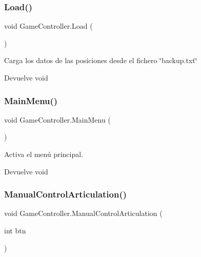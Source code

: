 \subsubsection{\texorpdfstring{Load()}{Load()}}
{\footnotesize\ttfamily void Game\+Controller.\+Load (\begin{DoxyParamCaption}{ }\end{DoxyParamCaption})\hspace{0.3cm}{\ttfamily [inline]}}

Carga los datos de las posiciones desde el fichero \char`\"{}backup.\+txt\char`\"{} \begin{DoxyReturn}{Devuelve}
void 
\end{DoxyReturn}
\mbox{\label{class_game_controller_aae26868d4e9c6e735d5fef9cc7b15bb1}} 
\subsubsection{\texorpdfstring{MainMenu()}{MainMenu()}}
{\footnotesize\ttfamily void Game\+Controller.\+Main\+Menu (\begin{DoxyParamCaption}{ }\end{DoxyParamCaption})\hspace{0.3cm}{\ttfamily [inline]}}

Activa el menú principal. \begin{DoxyReturn}{Devuelve}
void 
\end{DoxyReturn}
\mbox{\label{class_game_controller_af2f693d76f1b9bf4ff0403802ad44cae}} 
\subsubsection{\texorpdfstring{ManualControlArticulation()}{ManualControlArticulation()}}
{\footnotesize\ttfamily void Game\+Controller.\+Manual\+Control\+Articulation (\begin{DoxyParamCaption}\item[{int}]{btn }\end{DoxyParamCaption})\hspace{0.3cm}{\ttfamily [inline]}}

